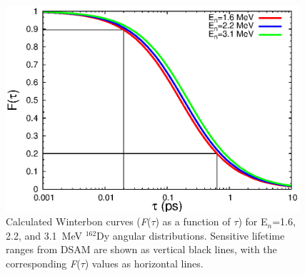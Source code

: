 \begin{figure}[ht]
\begin{center}
\includegraphics[width=0.97\textwidth]{ftau_all.eps}
\caption{Calculated Winterbon curves (\textit{F}(\textit{$\tau$}) as a function of \textit{$\tau$}) for E$_n$=1.6, 2.2, and 3.1~MeV $^{162}$Dy angular distributions. Sensitive lifetime ranges from DSAM are shown as vertical black lines, with the corresponding \textit{F}(\textit{$\tau$}) values as horizontal lines.
\label{fig:ftau_all}}
\end{center}
\end{figure}

